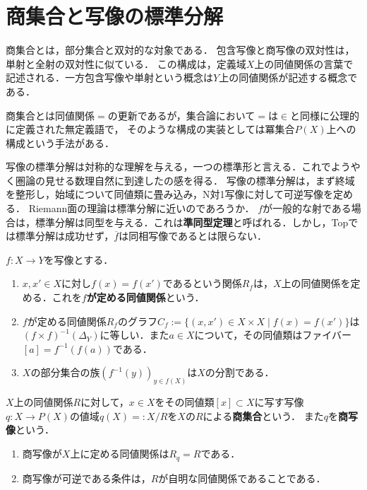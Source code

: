 \documentclass[uplatex,dvipdfmx]{jsreport}
\begin{document}
\section{商集合と写像の標準分解}

\begin{screen}
    商集合とは，部分集合と双対的な対象である．
    包含写像と商写像の双対性は，単射と全射の双対性に似ている．
    この構成は，定義域$X$上の同値関係の言葉で記述される．一方包含写像や単射という概念は$Y$上の同値関係が記述する概念である．

    商集合とは同値関係$=$の更新であるが，集合論において$=$は$\in$と同様に公理的に定義された無定義語で，
    そのような構成の実装としては冪集合$P(X)$上への構成という手法がある．

    写像の標準分解は対称的な理解を与える，一つの標準形と言える．これでようやく圏論の見せる数理自然に到達したの感を得る．
    写像の標準分解は，まず終域を整形し，始域について同値類に畳み込み，N対1写像に対して可逆写像を定める．
    Riemann面の理論は標準分解に近いのであろうか．
    $f$が一般的な射である場合は，標準分解は同型を与える．これは\textbf{準同型定理}と呼ばれる．しかし，Topでは標準分解は成功せず，$\overline{f}$は同相写像であるとは限らない．
\end{screen}

\begin{proposition}[写像が定める同値関係]
    $f:X\to Y$を写像とする．
    \begin{enumerate}
        \item $x,x'\in X$に対し$f(x)=f(x')$であるという関係$R_f$は，$X$上の同値関係を定める．これを\textbf{$f$が定める同値関係}という．
        \item $f$が定める同値関係$R_f$のグラフ$C_f:=\{(x,x')\in X\times X\mid f(x)=f(x')\}$は$(f\times f)^{-1}(\Delta_Y)$に等しい．また$a\in X$について，その同値類はファイバー$[a]=f^{-1}(f(a))$である．
        \item $X$の部分集合の族$(f^{-1}(y))_{y\in f(X)}$は$X$の分割である．
    \end{enumerate}
\end{proposition}

\begin{definition}
    $X$上の同値関係$R$に対して，$x\in X$をその同値類$[x]\subset X$に写す写像$q:X\to P(X)$の値域$q(X)=:X/R$を$X$の$R$による\textbf{商集合}という．
    また$q$を\textbf{商写像}という．
\end{definition}

\begin{remark}\mbox{}
    \begin{enumerate}
        \item 商写像が$X$上に定める同値関係は$R_q=R$である．
        \item 商写像が可逆である条件は，$R$が自明な同値関係であることである．
    \end{enumerate}
\end{remark}
\end{document}
